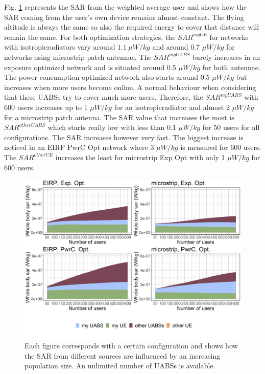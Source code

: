 \documentclass[twocolumn]{phdsymp} %
\begin{document}
Fig. \ref{fig:s3b_fourSourcesMatrix} represents the 
\gls{SAR} from the weighted average user and shows how the \gls{SAR} coming from the user's own device remains almost constant. 
The flying altitude is always the same so 
also the required energy to cover that distance will remain the same. 
For both optimization strategies, the $SAR^{myUE}$ for networks with \gls{isotropicradiator}s vary around $1.1\ \mu W/kg$  %
 and around  0.7 $\mu W/kg$ for networks using microstrip patch antennae.
The $SAR^{myUABS}$ barely increases in an exposure optimized network and is situated around 0.5 $\mu W/kg$ for both antennae.
The power consumption optimized network also starts around 0.5 $\mu W/kg$ but increases when more users become online. 
A normal behaviour when considering that these \gls{UABS}s try to cover much more users. Therefore, the $SAR^{myUABS}$ 
with 600 users increases up to 1 $\mu W/kg$ for an \gls{isotropicradiator} and almost 2 $\mu W/kg$ for a microstrip patch antenna.
The \gls{SAR} value that increases the most is $SAR^{otherUABS}$ which 
starts really low with less than 0.1 $\mu W/kg$ for 50 users for all configurations. 
The \gls{SAR} increases however very fast. The biggest increase is noticed in an \gls{EIRP} \gls{PwrC Opt} network 
where 3 $\mu W/kg$ is measured for 600 users. The $SAR^{otherUE}$ increases the least for microstrip \gls{Exp Opt} with 
only 1 $\mu W/kg$ for 600 users.
\begin{figure}[h!]
  \includegraphics[width=\linewidth]{../results/s3/uFourSources.png}
  \caption{Each figure corresponds with a certain configuration and shows how the \acs{SAR} 
  from different sources are influenced by an increasing population size. An unlimited number of \acs{UABS}s is available.
}
  \label{fig:s3b_fourSourcesMatrix}
\end{figure}
\end{document}
